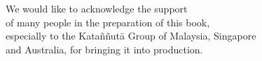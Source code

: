 
\mbox{}\vspace*{-\headsep}\vspace*{-2.5\baselineskip}\vspace*{2em}

\noindent%
\begin{minipage}[c][\textheight][c]{\paperwidth}

\noindent\hspace*{-20mm}%
\begin{minipage}{\paperwidth}
\centering\small

We would like to acknowledge the support \\
of many people in the preparation of this book, \\
especially to the Kata\~n\~nut\=a Group of Malaysia, Singapore \\
and Australia, for bringing it into production. 
\bigskip

\end{minipage}

\end{minipage}
